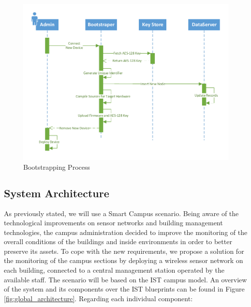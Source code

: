 \documentclass{sig-alternate-05-2015}
\begin{document}
\begin{figure}[h]
  \centering
  \includegraphics[width=1\linewidth]{figures/Sequence_Bootstrapping_Reviewed.pdf}
  \caption{Bootstrapping Process}
  \label{fig:bootstrapping_process}
\end{figure}

\subsection{System Architecture}
\label{sec:system_architecture}
As previously stated, we will use a Smart Campus scenario. 
Being aware of the technological improvements on sensor networks and building management technologies, the campus administration decided to improve the monitoring of the overall conditions of the buildings and inside environments in order to better preserve its assets. 
To cope with the new requirements, we propose a solution for the monitoring of the campus sections by deploying a wireless sensor network on each building, connected to a central management station operated by the available staff. 
The scenario will be based on the \gls{IST} campus model. An overview of the system and its components over the \gls{IST} blueprints can be found in Figure \ref{fig:global_architecture}. 
Regarding each individual component:
\end{document}
